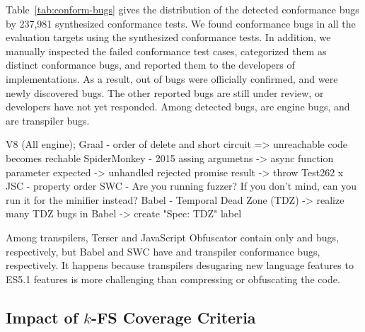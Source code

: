 
Table~\ref{tab:conform-bugs} gives the distribution of the detected conformance
bugs by 237,981 synthesized conformance tests.
%
We found conformance bugs in all the evaluation targets using the synthesized
conformance tests.
%
In addition, we manually inspected the failed conformance test cases,
categorized them as  distinct conformance bugs, and reported them to
the developers of implementations.
%
As a result,  out of  bugs were officially confirmed, and
 were newly discovered bugs.
%
The other  reported bugs are still under review, or developers have
not yet responded.
%
Among  detected bugs,  are engine bugs, and  are
transpiler bugs.
%

V8 (All engine);
Graal - order of delete and short circuit => unreachable code becomes rechable
SpiderMonkey -
2015 
assing argumetns -> async function parameter
expected -> unhandled rejected promise 
result -> throw 
Test262 x
JSC - property order
SWC - Are you running fuzzer? If you don't mind, can you run it for the minifier
instead?
Babel - Temporal Dead Zone (TDZ) -> realize many TDZ bugs in Babel -> create
"Spec: TDZ" label


Among transpilers, Terser and JavaScript Obfuscator contain only  and
 bugs, respectively, but Babel and SWC have  and
 transpiler conformance bugs, respectively.
%
It happens because transpilers desugaring new language features to ES5.1
features is more challenging than compressing or obfuscating the code.


\subsection{Impact of $k$-FS Coverage Criteria}\label{sec:impact-k-fs}

